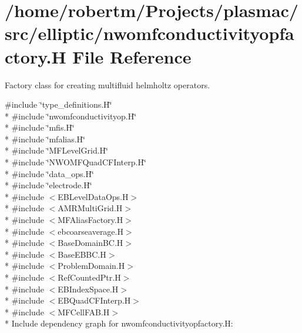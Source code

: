 \hypertarget{nwomfconductivityopfactory_8H}{}\section{/home/robertm/\+Projects/plasmac/src/elliptic/nwomfconductivityopfactory.H File Reference}
\label{nwomfconductivityopfactory_8H}


Factory class for creating multifluid helmholtz operators.  


{\ttfamily \#include \char`\"{}type\+\_\+definitions.\+H\char`\"{}}\\*
{\ttfamily \#include \char`\"{}nwomfconductivityop.\+H\char`\"{}}\\*
{\ttfamily \#include \char`\"{}mfis.\+H\char`\"{}}\\*
{\ttfamily \#include \char`\"{}mfalias.\+H\char`\"{}}\\*
{\ttfamily \#include \char`\"{}M\+F\+Level\+Grid.\+H\char`\"{}}\\*
{\ttfamily \#include \char`\"{}N\+W\+O\+M\+F\+Quad\+C\+F\+Interp.\+H\char`\"{}}\\*
{\ttfamily \#include \char`\"{}data\+\_\+ops.\+H\char`\"{}}\\*
{\ttfamily \#include \char`\"{}electrode.\+H\char`\"{}}\\*
{\ttfamily \#include $<$E\+B\+Level\+Data\+Ops.\+H$>$}\\*
{\ttfamily \#include $<$A\+M\+R\+Multi\+Grid.\+H$>$}\\*
{\ttfamily \#include $<$M\+F\+Alias\+Factory.\+H$>$}\\*
{\ttfamily \#include $<$ebcoarseaverage.\+H$>$}\\*
{\ttfamily \#include $<$Base\+Domain\+B\+C.\+H$>$}\\*
{\ttfamily \#include $<$Base\+E\+B\+B\+C.\+H$>$}\\*
{\ttfamily \#include $<$Problem\+Domain.\+H$>$}\\*
{\ttfamily \#include $<$Ref\+Counted\+Ptr.\+H$>$}\\*
{\ttfamily \#include $<$E\+B\+Index\+Space.\+H$>$}\\*
{\ttfamily \#include $<$E\+B\+Quad\+C\+F\+Interp.\+H$>$}\\*
{\ttfamily \#include $<$M\+F\+Cell\+F\+A\+B.\+H$>$}\\*
Include dependency graph for nwomfconductivityopfactory.\+H\+:\nopagebreak
